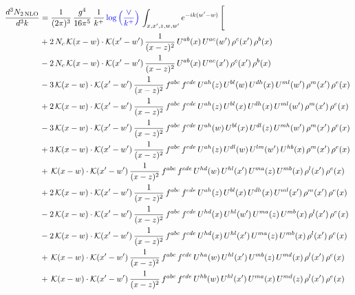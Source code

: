 \documentclass[9pt]{article}
\numberwithin{equation}{section}
\begin{document}
\begin{align}
\frac{d^{3}N_{2\,\mathrm{NLO}}}{d^{3}k} & = \frac{1}{(2\pi)^{3}}\,\frac{g^{4}}{16\pi^{5}}\,\frac{1}{k^{+}}\,{\color{blue}\log{\left(\frac{\vee}{k^{+}}\right)}}\,\int_{x,x',z,w,w'}e^{-ik(w'-w)}\,\Bigg[
\notag\\ &+2\,N_{c}\,\mathcal{K}(x-w)\cdot\mathcal{K}(x'-w')\,\frac{1}{(x-z)^{2}}\,U^{ab}(x)\,U^{ac}(w')\,\rho^{c}(x')\,\rho^{b}(x)\notag\\
&-2\,N_{c}\,\mathcal{K}(x-w)\cdot\mathcal{K}(x'-w')\,\frac{1}{(x-z)^{2}}\,U^{ab}(x)\,U^{ac}(x')\,\rho^{c}(x')\,\rho^{b}(x)\notag\\
&-3\,\mathcal{K}(x-w)\cdot\mathcal{K}(x'-w')\,\frac{1}{(x-z)^{2}}\,f^{abc}\,f^{cde}\,U^{ah}(z)\,U^{bl}(w)\,U^{dh}(x)\,U^{ml}(w')\,\rho^{m}(x')\,\rho^{e}(x)\notag\\
&+2\,\mathcal{K}(x-w)\cdot\mathcal{K}(x'-w')\,\frac{1}{(x-z)^{2}}\,f^{abc}\,f^{cde}\,U^{ah}(z)\,U^{bl}(x)\,U^{dh}(x)\,U^{ml}(w')\,\rho^{m}(x')\,\rho^{e}(x)\notag\\
&-3\,\mathcal{K}(x-w)\cdot\mathcal{K}(x'-w')\,\frac{1}{(x-z)^{2}}\,f^{abc}\,f^{cde}\,U^{ah}(w)\,U^{bl}(x)\,U^{dl}(z)\,U^{mh}(w')\,\rho^{m}(x')\,\rho^{e}(x)\notag\\
&+3\,\mathcal{K}(x-w)\cdot\mathcal{K}(x'-w')\,\frac{1}{(x-z)^{2}}\,f^{abc}\,f^{cde}\,U^{ah}(z)\,U^{dl}(w)\,U^{lm}(w')\,U^{hb}(x)\,\rho^{m}(x')\,\rho^{e}(x)\notag\\
&+\,\mathcal{K}(x-w)\cdot\mathcal{K}(x'-w')\,\frac{1}{(x-z)^{2}}\,f^{abc}\,f^{cde}\,U^{hd}(w)\,U^{hl}(x')\,U^{ma}(z)\,U^{mb}(x)\,\rho^{l}(x')\,\rho^{e}(x)\notag\\
&+2\,\mathcal{K}(x-w)\cdot\mathcal{K}(x'-w')\,\frac{1}{(x-z)^{2}}\,f^{abc}\,f^{cde}\,U^{ah}(z)\,U^{bl}(x)\,U^{dh}(x)\,U^{ml}(x')\,\rho^{m}(x')\,\rho^{e}(x)\notag\\
&-2\,\mathcal{K}(x-w)\cdot\mathcal{K}(x'-w')\,\frac{1}{(x-z)^{2}}\,f^{abc}\,f^{cde}\,U^{hd}(x)\,U^{hl}(w')\,U^{ma}(z)\,U^{mb}(x)\,\rho^{l}(x')\,\rho^{e}(x)\notag\\
&-2\,\mathcal{K}(x-w)\cdot\mathcal{K}(x'-w')\,\frac{1}{(x-z)^{2}}\,f^{abc}\,f^{cde}\,U^{hd}(x)\,U^{hl}(x')\,U^{ma}(z)\,U^{mb}(x)\,\rho^{l}(x')\,\rho^{e}(x)\notag\\
&+\,\mathcal{K}(x-w)\cdot\mathcal{K}(x'-w')\,\frac{1}{(x-z)^{2}}\,f^{abc}\,f^{cde}\,U^{ha}(w)\,U^{hl}(x')\,U^{mb}(z)\,U^{md}(x)\,\rho^{l}(x')\,\rho^{e}(x)\notag\\
&+\,\mathcal{K}(x-w)\cdot\mathcal{K}(x'-w')\,\frac{1}{(x-z)^{2}}\,f^{abc}\,f^{cde}\,U^{hb}(w)\,U^{hl}(x')\,U^{ma}(x)\,U^{md}(z)\,\rho^{l}(x')\,\rho^{e}(x)\notag\\

\end{align}
\end{document}
